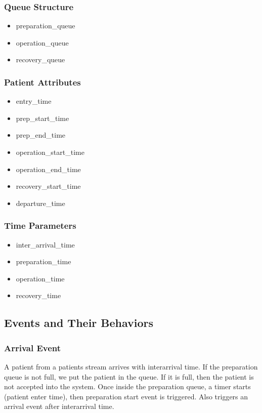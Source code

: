 \documentclass{article}
\begin{document}
\subsubsection{Queue Structure}
\begin{itemize}
    \item preparation\_queue
    \item operation\_queue
    \item recovery\_queue
\end{itemize}

\subsubsection{Patient Attributes}
\begin{itemize}
    \item entry\_time
    \item prep\_start\_time
    \item prep\_end\_time
    \item operation\_start\_time
    \item operation\_end\_time
    \item recovery\_start\_time
    \item departure\_time
\end{itemize}

\subsubsection{Time Parameters}
\begin{itemize}
    \item inter\_arrival\_time
    \item preparation\_time
    \item operation\_time
    \item recovery\_time
\end{itemize}

\subsection{Events and Their Behaviors}

\subsubsection{Arrival Event}
A patient from a patients stream arrives with interarrival time. If the preparation queue is not full, we put the patient in the queue. 
If it is full, then the patient is not accepted into the system. Once inside the preparation queue, a timer starts (patient enter time), 
then preparation start event is triggered. Also triggers an arrival event after interarrival time.
\end{document}
